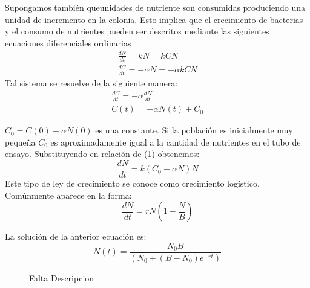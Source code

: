 Supongamos también queunidades de nutriente son consumidas produciendo una unidad de incremento en la colonia. Esto implica que el crecimiento de bacterias y el consumo de nutrientes pueden ser descritos mediante las siguientes ecuaciones diferenciales ordinarias
\begin{equation}
    \begin{split} %
        \frac{dN}{dt} = kN = kCN\\
        \frac{dC}{dt} = -\alpha N = -\alpha k CN
    \end{split}
\end{equation}
Tal sistema se resuelve de la siguiente manera:
\begin{equation}
    \begin{split}
        \frac{dC}{dt} = -\alpha \frac{dN}{dt}\\
        C(t) = -\alpha N(t) + C_{0}
    \end{split}
\end{equation}
 

$C_{0} = C(0) + \alpha N(0)$ es una constante. Si la población es inicialmente muy pequeña $C_{0}$ es aproximadamente igual a la cantidad de nutrientes en el tubo de ensayo. Substituyendo en relaci\'on de (1) obtenemos:
\begin{equation}
    \frac{dN}{dt} = k(C_{0} - \alpha N)N
\end{equation}
Este tipo de ley de crecimiento se conoce como crecimiento logístico. Comúnmente aparece en la forma:
\begin{equation}
    \frac{dN}{dt} = rN(1 - \frac{N}{B})
\end{equation}

La soluci\'on de la anterior ecuaci\'on es:
\begin{equation}
    N(t) = \frac{N_{0}B}{(N_{0} + (B - N_{0})e^{-rt})}
\end{equation}
\begin{figure}[!ht]
\begin{center}
\end{center}\vspace*{-0.6cm}
\caption[Imagen de Oncogenes. Falta poner leyenda]{Falta Descripcion}
\label{fig-logistico}
\end{figure}

